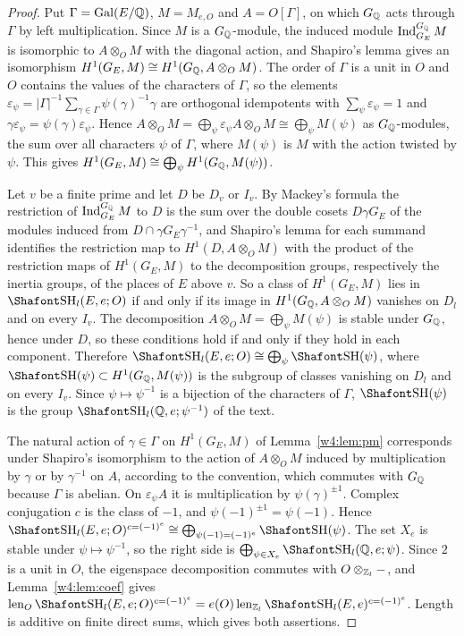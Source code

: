 \begin{proof}
Put $\Gamma=\operatorname{Gal}(E/\mathbb Q)$, $M=M_{e,O}$ and $A=O[\Gamma]$, on which $G_\mathbb Q$ acts through $\Gamma$ by left multiplication. Since $M$ is a $G_\mathbb Q$-module, the induced module $\operatorname{Ind}_{G_E}^{G_\mathbb Q}M$ is isomorphic to $A\otimes_OM$ with the diagonal action, and Shapiro's lemma gives an isomorphism $H^1(G_E,M)\cong H^1(G_\mathbb Q,A\otimes_OM)$. The order of $\Gamma$ is a unit in $O$ and $O$ contains the values of the characters of $\Gamma$, so the elements $\varepsilon_\psi=\lvert\Gamma\rvert^{-1}\sum_{\gamma\in\Gamma}\psi(\gamma)^{-1}\gamma$ are orthogonal idempotents with $\sum_\psi\varepsilon_\psi=1$ and $\gamma\varepsilon_\psi=\psi(\gamma)\varepsilon_\psi$. Hence $A\otimes_OM=\bigoplus_\psi\varepsilon_\psi A\otimes_OM\cong\bigoplus_\psi M(\psi)$ as $G_\mathbb Q$-modules, the sum over all characters $\psi$ of $\Gamma$, where $M(\psi)$ is $M$ with the action twisted by $\psi$. This gives $H^1(G_E,M)\cong\bigoplus_\psi H^1(G_\mathbb Q,M(\psi))$.

Let $v$ be a finite prime and let $D$ be $D_v$ or $I_v$. By Mackey's formula the restriction of $\operatorname{Ind}_{G_E}^{G_\mathbb Q}M$ to $D$ is the sum over the double cosets $D\gamma G_E$ of the modules induced from $D\cap\gamma G_E\gamma^{-1}$, and Shapiro's lemma for each summand identifies the restriction map to $H^1(D,A\otimes_OM)$ with the product of the restriction maps of $H^1(G_E,M)$ to the decomposition groups, respectively the inertia groups, of the places of $E$ above $v$. So a class of $H^1(G_E,M)$ lies in $\Sha_l(E,e;O)$ if and only if its image in $H^1(G_\mathbb Q,A\otimes_OM)$ vanishes on $D_l$ and on every $I_v$. The decomposition $A\otimes_OM=\bigoplus_\psi M(\psi)$ is stable under $G_\mathbb Q$, hence under $D$, so these conditions hold if and only if they hold in each component. Therefore $\Sha_l(E,e;O)\cong\bigoplus_\psi\Sha(\psi)$, where $\Sha(\psi)\subset H^1(G_\Q,M(\psi))$ is the subgroup of classes vanishing on $D_l$ and on every $I_v$. Since $\psi\mapsto\psi^{-1}$ is a bijection of the characters of $\Gamma$, $\Sha(\psi)$ is the group $\Sha_l(\Q,e;\psi^{-1})$ of the text.

The natural action of $\gamma\in\Gamma$ on $H^1(G_E,M)$ of Lemma~\ref{w4:lem:pm} corresponds under Shapiro's isomorphism to the action of $A\otimes_OM$ induced by multiplication by $\gamma$ or by $\gamma^{-1}$ on $A$, according to the convention, which commutes with $G_\mathbb Q$ because $\Gamma$ is abelian. On $\varepsilon_\psi A$ it is multiplication by $\psi(\gamma)^{\pm1}$. Complex conjugation $c$ is the class of $-1$, and $\psi(-1)^{\pm1}=\psi(-1)$. Hence $\Sha_l(E,e;O)^{c=(-1)^e}\cong\bigoplus_{\psi(-1)=(-1)^e}\Sha(\psi)$. The set $X_e$ is stable under $\psi\mapsto\psi^{-1}$, so the right side is $\bigoplus_{\psi\in X_e}\Sha_l(\Q,e;\psi)$. Since $2$ is a unit in $O$, the eigenspace decomposition commutes with $O\otimes_{\mathbb Z_l}-$, and Lemma~\ref{w4:lem:coef} gives $\len_O\Sha_l(E,e;O)^{c=(-1)^e}=e(O)\len_{\Zl}\Sha_l(E,e)^{c=(-1)^e}$. Length is additive on finite direct sums, which gives both assertions.
\end{proof}


